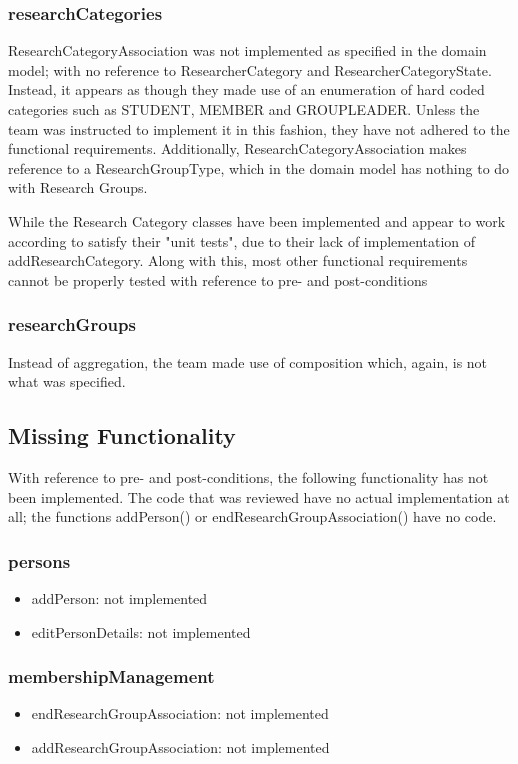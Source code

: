 \documentclass{article}
\begin{document}
\subsubsection{researchCategories}
ResearchCategoryAssociation was not implemented as specified in the domain model; with no reference to ResearcherCategory and ResearcherCategoryState. Instead, it appears as though they made use of an enumeration of hard coded categories such as STUDENT, MEMBER and GROUPLEADER. Unless the team was instructed to implement it in this fashion, they have not adhered to the functional requirements. Additionally, ResearchCategoryAssociation makes reference to a ResearchGroupType, which in the domain model has nothing to do with Research Groups.

While the Research Category classes have been implemented and appear to work according to satisfy their "unit tests", due to their lack of implementation of addResearchCategory. Along with this, most other functional requirements cannot be properly tested with reference to pre- and post-conditions

\subsubsection{researchGroups}

Instead of aggregation, the team made use of composition which, again, is not what was specified.
\newpage

\subsection{Missing Functionality}

With reference to pre- and post-conditions, the following functionality has not been implemented. The code that was reviewed have no actual implementation at all; the functions addPerson() or endResearchGroupAssociation() have no code.

\subsubsection{persons} 
\begin{itemize}
	\item addPerson: not implemented
	\item editPersonDetails: not implemented
\end{itemize}

\subsubsection{membershipManagement}
\begin{itemize}
	\item endResearchGroupAssociation: not implemented
	\item addResearchGroupAssociation: not implemented
\end{itemize}
\end{document}
